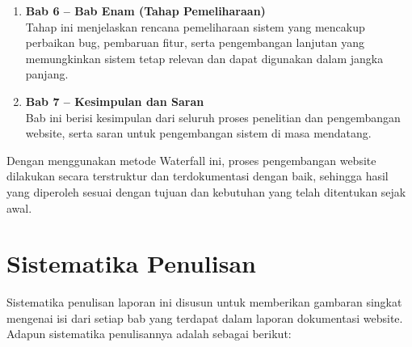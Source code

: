 \begin{enumerate}
    \item \textbf{Bab 6 – Bab Enam (Tahap Pemeliharaan)}\\
    Tahap ini menjelaskan rencana pemeliharaan sistem yang mencakup perbaikan bug, pembaruan fitur, serta pengembangan lanjutan yang memungkinkan sistem tetap relevan dan dapat digunakan dalam jangka panjang.

    \item \textbf{Bab 7 – Kesimpulan dan Saran}\\
    Bab ini berisi kesimpulan dari seluruh proses penelitian dan pengembangan website, serta saran untuk pengembangan sistem di masa mendatang.
\end{enumerate}

Dengan menggunakan metode Waterfall ini, proses pengembangan website dilakukan secara terstruktur dan terdokumentasi dengan baik, sehingga hasil yang diperoleh sesuai dengan tujuan dan kebutuhan yang telah ditentukan sejak awal.

\section{Sistematika Penulisan}
Sistematika penulisan laporan ini disusun untuk memberikan gambaran singkat mengenai isi dari setiap bab yang terdapat dalam laporan dokumentasi website. Adapun sistematika penulisannya adalah sebagai berikut:

